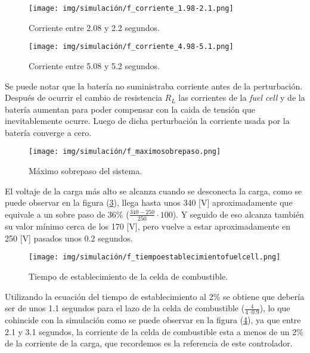 \begin{figure}[H]
    \centering
    \texttt{[image: img/simulación/f\_corriente\_1.98-2.1.png]}
    \caption{Corriente entre 2.08 y 2.2 segundos.}
    \label{fig:f_corriente_1.98-2.1}
\end{figure}

\begin{figure}[H]
    \centering
    \texttt{[image: img/simulación/f\_corriente\_4.98-5.1.png]}
    \caption{Corriente entre 5.08 y 5.2 segundos.}
\label{fig:f_corriente_4.98-5.1}
\end{figure}

Se puede notar que la batería no suministraba corriente antes de la perturbación. 
Después de ocurrir el cambio de resistencia $R_L$ las corrientes de la \textit{fuel cell} y de
la batería aumentan para poder compensar con la caida de tensión que inevitablemente ocurre. 
Luego de dicha perturbación la corriente usada por la batería converge a cero. 

\begin{figure}[H]
    \centering
    \texttt{[image: img/simulación/f\_maximosobrepaso.png]}
    \caption{Máximo sobrepaso del sistema.}
\label{fig:f_maximosobrepaso}
\end{figure}

El voltaje de la carga más alto se alcanza cuando se desconecta la carga, como se puede observar 
en la figura (\ref{fig:f_maximosobrepaso}), llega hasta unos 340 [V] aproximadamente
que equivale a un sobre paso de 36\% ($\frac{340-250}{250} \cdot 100$). Y seguido de eso alcanza 
también su valor mínimo cerca de los 170 [V], pero vuelve a estar aproximadamente en 250 [V]
pasados unos 0.2 segundos.

\begin{figure}[H]
    \centering
    \texttt{[image: img/simulación/f\_tiempoestablecimientofuelcell.png]}
    \caption{Tiempo de establecimiento de la celda de combustible.}
    \label{fig:f_tiempoestablecimientofuelcell}
\end{figure}

Utilizando la ecuación del tiempo de establecimiento al 2\% se obtiene que debería ser de unos
1.1 segundos para el lazo de la celda de combustible ($\frac{4}{4\cdot0.9}$), lo que cohincide con la simulación
como se puede observar en la figura (\ref{fig:f_tiempoestablecimientofuelcell}), ya que entre 
2.1 y 3.1 segundos, la corriente de la celda de combustible esta a menos de un 2\% de la corriente de la 
carga, que recordemos es la referencia de este controlador.

